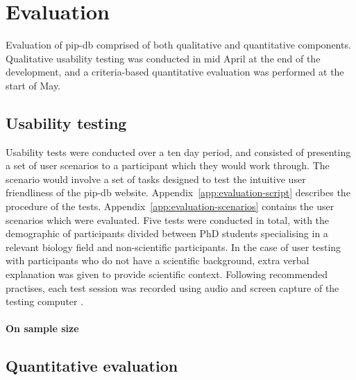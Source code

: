 \chapter{Evaluation}\label{chap:evaluation}

Evaluation of pip-db comprised of both qualitative and quantitative
components. Qualitative usability testing was conducted in mid April
at the end of the development, and a criteria-based quantitative
evaluation was performed at the start of May.

\section{Usability testing}\label{sec:usability-testing}

Usability tests were conducted over a ten day period, and consisted of
presenting a set of user scenarios to a participant which they would
work through. The scenario would involve a set of tasks designed to
test the intuitive user friendliness of the pip-db
website. Appendix~\ref{app:evaluation-script} describes the procedure
of the tests. Appendix~\ref{app:evaluation-scenarios} contains the
user scenarios which were evaluated. Five tests were conducted in
total, with the demographic of participants divided between PhD
students specialising in a relevant biology field and non-scientific
participants. In the case of user testing with participants who do not
have a scientific background, extra verbal explanation was given to
provide scientific context. Following recommended practises, each test
session was recorded using audio and screen capture of the testing
computer \cite{dumas1999practical}.

\subsubsection*{On sample size}
\cite{nielsen2000you, rubin2008handbook}


\section{Quantitative evaluation}\label{sec:quantitative-evaluation}

\cite{jackson2011evaluation}


